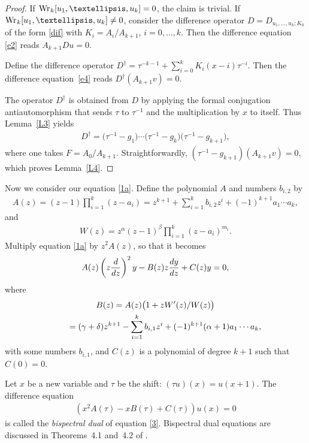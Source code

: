 \documentclass[11pt]{article}
\numberwithin{equation}{section}
\def\lc{,\allowbreak\ldots,\allowbreak}
\def\Wr{\mathop{\mathrm{Wr\vrule height0pt width.6pt}}\nolimits}
\begin{document}
\begin{proof} If $\Wr_k[u_1\lc u_k]=0$, the claim is trivial. If $\Wr_k[u_1\lc u_k]\ne 0$, consider the difference operator $D=D_{u_1\lc u_k; K_0}$ of the form \eqref{dif} with $K_i=A_i/A_{k+1}$, $i=0\lc k$. Then the difference equation \eqref{e2} reads $A_{k+1} Du=0$.

Define the difference operator $D^\dag=\tau^{-k-1}+\sum\limits_{i=0}^kK_i(x-i) \tau^{-i}$. Then the difference equa\-tion~\eqref{e4} reads $D^\dag(A_{k+1}v)=0$.

The operator $D^\dag$ is obtained from $D$ by applying the formal conjugation antiautomorphism that sends $\tau$ to $\tau^{-1}$ and the multiplication by $x$ to itself. Thus Lemma~\ref{L3} yields
\begin{gather*}
D^\dag= \big(\tau^{-1}-g_1\big) \cdots \big(\tau^{-1}-g_k\big) \big(\tau^{-1}-g_{k+1}\big),
\end{gather*}
where one takes $F=A_0/A_{k+1}$. Straightforwardly, $(\tau^{-1}-g_{k+1}) (A_{k+1}v)=0$, which proves Lemma~\ref{L4}.
 \end{proof}

Now we consider our equation \eqref{1a}. Define the polynomial $A$ and numbers $b_{i,2}$ by
\begin{gather}\label{A}
A(z)=(z-1)\prod_{i=1}^k(z-a_i)= z^{k+1}+\sum_{i=1}^k b_{i,2}z^i+(-1)^{k+1}a_1\cdots a_k,
\end{gather}
and
\begin{gather*}
W(z)=z^\alpha(z-1)^\beta\prod_{i=1}^k(z-a_i)^{m_i}.
\end{gather*}
Multiply equation \eqref{1a} by $z^2A(z)$, so that it becomes
\begin{gather}
A(z) \left(z\frac{{\rm d}}{{\rm d}z}\right)^{ 2}y-B(z) z\frac{{\rm d}y}{{\rm d}z}+C(z)y=0,\label{3}
\end{gather}
where
\begin{gather}%
B(z) = A(z)\bigl(1+zW'(z)/W(z)\bigr)\nonumber\\
\hphantom{B(z)}{} = (\gamma+\delta)z^{k+1}-\sum_{i=1}^k b_{i,1}z^i+(-1)^{k+1}(\alpha+1) a_1\cdots a_k,\label{B2}
\end{gather}
with some numbers $b_{i,1}$, and $C(z)$ is a polynomial of degree $k+1$ such that $C(0)=0$.

Let $x$ be a new variable and $\tau$ be the shift: $(\tau u)(x)=u(x+1)$. The difference equation
\begin{gather}
\left(x^2A(\tau)-xB(\tau)+C(\tau)\right) u(x)=0\label{4}
\end{gather}
is called the {\it bispectral dual} of equation \eqref{3}. Bispectral dual equations are discussed in Theorems~4.1 and~4.2 of \cite{MTV}.
\end{document}
